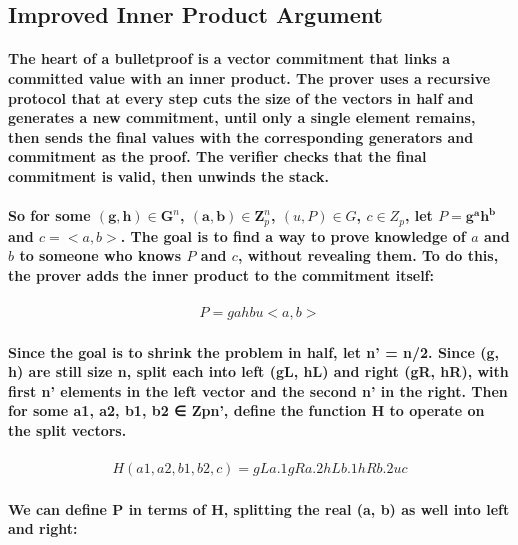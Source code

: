 \documentclass{article}
\begin{document}
\subsection{Improved Inner Product Argument}

\paragraph{The heart of a bulletproof is a vector commitment that links a committed value with an inner product.  The prover uses a recursive protocol that at every step cuts the size of the vectors in half and generates a new commitment, until only a single element remains, then sends the final values with the corresponding generators and commitment as the proof.  The verifier checks that the final commitment is valid, then unwinds the stack.}

\paragraph{So for some $(\textbf{g}, \textbf{h}) \in \textbf{G}^n$, $(\textbf{a}, \textbf{b}) \in \textbf{Z}_p^n$, $(u, P) \in G$, $c \in Z_p$, let $P = \textbf{g}^\textbf{a} \textbf{h}^\textbf{b}$ and $c = <a, b>$.  The goal is to find a way to prove knowledge of $a$ and $b$ to someone who knows $P$ and $c$, without revealing them.  To do this, the prover adds the inner product to the commitment itself:}

\begin{eqnarray}
  P = ga hb u<a, b>
\end{eqnarray}

\paragraph{Since the goal is to shrink the problem in half, let n’ = n/2.  Since (g, h) are still size n, split each into left (gL, hL) and right (gR, hR), with first n’ elements in the left vector and the second n’ in the right.  Then for some a1, a2, b1, b2 ∈ Zpn’, define the function H to operate on the split vectors. }

\begin{eqnarray}
  H(a1, a2, b1, b2, c) = gLa.1 gRa.2 hLb.1 hRb.2 uc
\end{eqnarray}

\paragraph{We can define P in terms of H, splitting the real (a, b) as well into left and right:}
\end{document}
